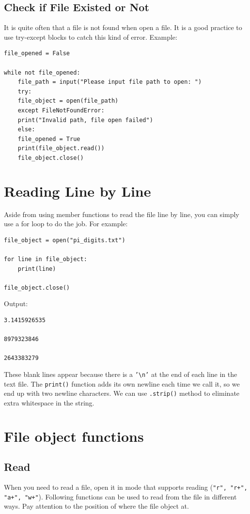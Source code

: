 \documentclass[12pt]{book}
\begin{document}
\subsection{Check if File Existed or Not}
\label{sec:org466cd0b}
It is quite often that a file is not found when open a file. It is a good practice to use try-except blocks to catch this kind of error. Example:
\begin{verbatim}
file_opened = False

while not file_opened:
    file_path = input("Please input file path to open: ")
    try:
	file_object = open(file_path)
    except FileNotFoundError:
	print("Invalid path, file open failed")
    else:
	file_opened = True
	print(file_object.read())
	file_object.close()
\end{verbatim}
\section{Reading Line by Line}
\label{sec:org4171625}
Aside from using member functions to read the file line by line, you can simply use a for loop to do the job. For example:
\begin{verbatim}
file_object = open("pi_digits.txt")

for line in file_object:
    print(line)

file_object.close()
\end{verbatim}
Output:
\begin{verbatim}
3.1415926535

8979323846

2643383279

\end{verbatim}
These blank lines appear because there is a \texttt{'\textbackslash{}n'} at the end of each line in the text file. The \texttt{print()} function adds its own newline each time we call it, so we end up with two newline characters. We can use \texttt{.strip()} method to eliminate extra whitespace in the string.

\section{File object functions}
\label{sec:orgd62f1e4}
\subsection{Read}
\label{sec:orgb3c8c2c}
When you need to read a file, open it in mode that supports reading (\texttt{"r", "r+", "a+", "w+"}). Following functions can be used to read from the file in different ways. Pay attention to the position of where the file object at.
\end{document}
